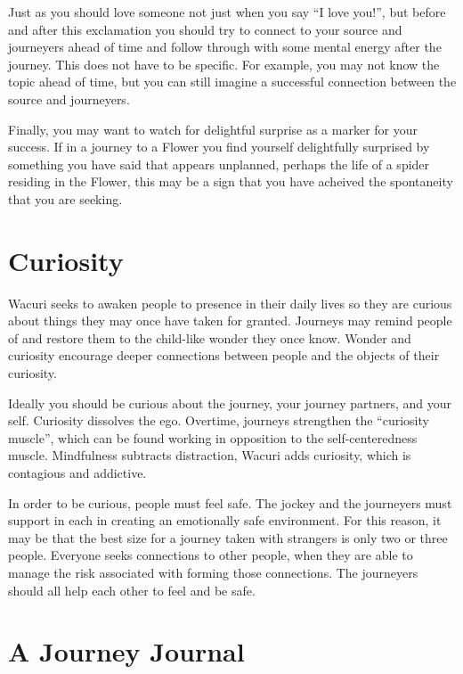 \documentclass[12pt]{book}
\begin{document}
Just as you should love someone not just when you
say ``I love you!'', but before and after this
exclamation you should try to connect to your
source and journeyers ahead of time and follow
through with some mental energy after the journey.
This does not have to be specific. For example,
you may not know the topic ahead of time, but
you can still imagine a successful connection
between the source and journeyers.


Finally, you may want to watch for
delightful surprise as a marker for your
success. If in a journey to a Flower you
find yourself delightfully surprised by
something you have said that appears unplanned,
perhaps the life of a spider residing in the
Flower, this may be a sign that you have
acheived the spontaneity that you are seeking.





\chapter{Curiosity}

Wacuri seeks to awaken people to presence in their daily
lives so they are curious about things they may once have taken for
granted. Journeys may remind people of and restore them to the child-like
wonder they once know. Wonder and curiosity encourage deeper connections
between people and the objects of their curiosity.

Ideally you should be curious about the journey, your journey partners,
and your self. Curiosity dissolves the ego. Overtime, journeys strengthen the ``curiosity muscle'',
which can be found working in opposition to the self-centeredness muscle.
Mindfulness subtracts distraction, Wacuri adds curiosity, which is contagious and addictive.

In order to be curious, people must feel safe. The jockey and the journeyers must
support in each in creating an emotionally safe environment. For this reason, it
may be that the best size for a journey taken with strangers is only two or three people.
Everyone seeks connections to other people, when they are able to manage the risk associated with
forming those connections. The journeyers should all help each other to feel and be safe.

\chapter{A Journey Journal}
\end{document}
